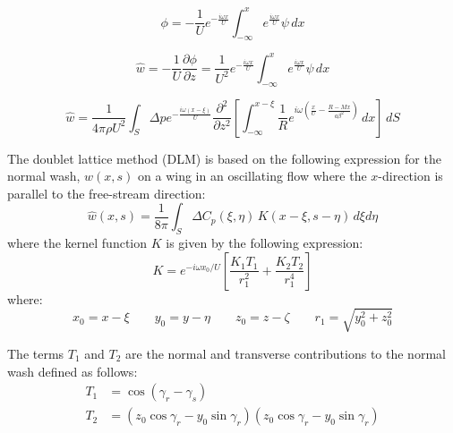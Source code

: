 \documentclass[12pt]{article}
\newcommand{\p}{\partial}
\newcommand{\f}{\frac}
\begin{document}
\begin{equation*}
  \phi = -\f{1}{U} e^{-\f{i\omega x}{U}} \int_{-\infty}^{x} e^{\f{i\omega x}{U}} \psi \, dx
\end{equation*}

\begin{equation*}
  \hat{w} = - \f{1}{U} \f{\p \phi}{\p z} = \f{1}{U^2} e^{-\f{i\omega x}{U}} \int_{-\infty}^{x} e^{\f{i\omega x}{U}} \psi \, dx
\end{equation*}


\begin{equation*}
  \hat{w} = \f{1}{4\pi \rho U^2} \int_{S} \Delta p e^{-\f{i\omega(x - \xi)}{U}} 
  \f{\p^2}{\p z^2} \left[ 
    \int_{-\infty}^{x - \xi} \f{1}{R} e^{i\omega\left( \f{x}{U} - \f{R - Mx}{a\beta^2} \right)} \, dx 
    \right] \, dS
\end{equation*}


The doublet lattice method (DLM) is based on the following expression
for the normal wash, $w(x, s)$ on a wing in an oscillating flow where
the $x$-direction is parallel to the free-stream direction:
%
\begin{equation}
  \label{eqn:normal-wash}
  \hat{w}(x, s) = \f{1}{8\pi} 
  \int_{S} \Delta C_p(\xi, \eta) \, K(x - \xi, s - \eta) \, d\xi d\eta 
\end{equation}
where the kernel function $K$ is given by the following expression:
%
\begin{equation*}
  K = e^{-i\omega x_{0}/U} \left[ \f{K_1 T_1}{r_{1}^2} + \f{K_2 T_2}{r_{1}^4} \right]
\end{equation*}
where:
%
\begin{equation*}
  x_{0} = x - \xi \qquad
  y_{0} = y - \eta \qquad
  z_{0} = z - \zeta \qquad 
  r_{1} = \sqrt{y_{0}^2 + z_{0}^2}
\end{equation*}

The terms $T_{1}$ and $T_{2}$ are the normal and transverse
contributions to the normal wash defined as follows:
\begin{equation*}
  \begin{aligned}
    T_{1} & = \cos(\gamma_r - \gamma_s) \\
    T_{2} & = (z_{0} \cos \gamma_r - y_{0} \sin \gamma_r)(z_{0} \cos \gamma_r - y_{0} \sin \gamma_r)
  \end{aligned}
\end{equation*}
\end{document}
